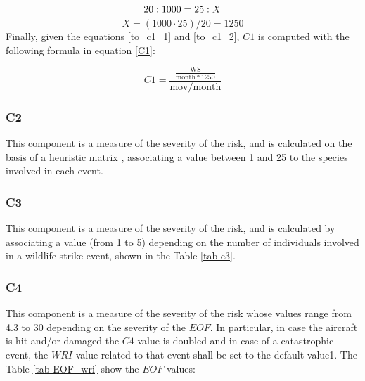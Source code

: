 \begin{equation}\label{to_c1_1}
20 : 1000 = 25 : X \\
\end{equation}
\begin{equation}\label{to_c1_2}
X = (1000 \cdot 25)/20 = 1250
\end{equation}
Finally, given the equations \ref{to_c1_1} and \ref{to_c1_2}, $C1$ is computed with the following formula in equation \ref{C1}:

\begin{equation}\label{C1}
C1 = \frac{\frac{\mathrm{WS}}{\mathrm{month}*1250}}{\mathrm{mov}/\mathrm{month}}
\end{equation}

\subsubsection{C2}
This component is a measure of the severity of the risk, and is calculated on the basis of a heuristic matrix \cite{allan2006heuristic}, associating a value between 1 and 25 to the species involved in each event.

\subsubsection{C3}
This component is a measure of the severity of the risk, and is calculated by associating a value (from 1 to 5) depending on the number of individuals involved in a wildlife strike event, shown in the Table \ref{tab-c3}.

\begin{table}
	\centering
	\caption{$C3$: measure of the severity of the risk. The table lists in ascending order the hazard values attributed to the number of animals involved in wildlife strike events.}
	\label{tab-c3}
\end{table}

\subsubsection{C4}
This component is a measure of the severity of the risk whose values range from 4.3 to 30 depending on the severity of the $EOF$.
In particular, in case the aircraft is hit and/or damaged the $C4$ value is doubled and in case of a catastrophic event, the $WRI$ value related to that event shall be set to the default value1.
The Table \ref{tab-EOF_wri} show the $EOF$ values:

